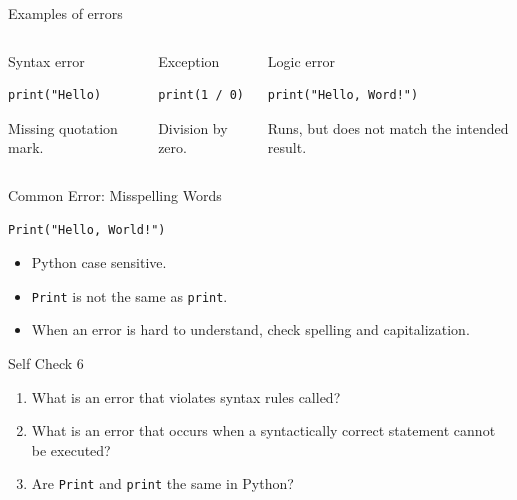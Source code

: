 \documentclass[aspectratio=169,10pt]{beamer}
\begin{document}
\begin{frame}[fragile]{Examples of errors}
\small
\begin{columns}[T,onlytextwidth]
\begin{block}{Syntax error}
\begin{lstlisting}
print("Hello)
\end{lstlisting}
Missing quotation mark.
\end{block}

\begin{block}{Exception}
\begin{lstlisting}
print(1 / 0)
\end{lstlisting}
Division by zero.
\end{block}

\begin{block}{Logic error}
\begin{lstlisting}
print("Hello, Word!")
\end{lstlisting}
Runs, but does not match the intended result.
\end{block}
\end{columns}
\end{frame}

\begin{frame}[fragile]{Common Error: Misspelling Words}
\begin{lstlisting}
Print("Hello, World!")
\end{lstlisting}

\begin{itemize}
  \item Python case sensitive.
  \item \texttt{Print} is not the same as \texttt{print}.
  \item When an error is hard to understand, check spelling and capitalization.
\end{itemize}
\end{frame}

\begin{frame}{Self Check 6}
\begin{enumerate}
  \item What is an error that violates syntax rules called?
  \item What is an error that occurs when a syntactically correct statement cannot be executed?
  \item Are \texttt{Print} and \texttt{print} the same in Python?
\end{enumerate}
\end{frame}
\end{document}
